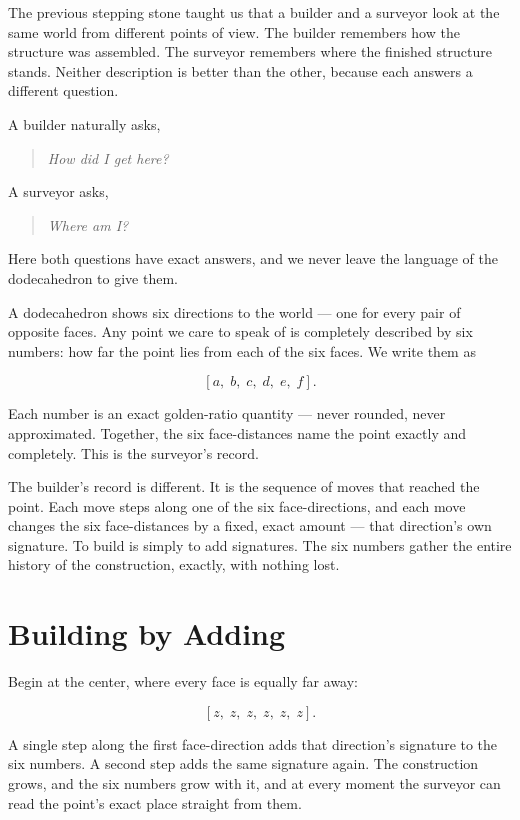 \label{stone:finding-our-way-home}

The previous stepping stone taught us that a builder and a surveyor look at the same world from different points of view. The builder remembers how the structure was assembled. The surveyor remembers where the finished structure stands. Neither description is better than the other, because each answers a different question.

A builder naturally asks,

\begin{quote}
\emph{How did I get here?}
\end{quote}

A surveyor asks,

\begin{quote}
\emph{Where am I?}
\end{quote}

Here both questions have exact answers, and we never leave the language of the dodecahedron to give them.

A dodecahedron shows six directions to the world --- one for every pair of opposite faces. Any point we care to speak of is completely described by six numbers: how far the point lies from each of the six faces. We write them as

\[
[a,\;b,\;c,\;d,\;e,\;f].
\]

Each number is an exact golden-ratio quantity --- never rounded, never approximated. Together, the six face-distances name the point exactly and completely. This is the surveyor's record.

The builder's record is different. It is the sequence of moves that reached the point. Each move steps along one of the six face-directions, and each move changes the six face-distances by a fixed, exact amount --- that direction's own signature. To build is simply to add signatures. The six numbers gather the entire history of the construction, exactly, with nothing lost.

\section*{Building by Adding}

Begin at the center, where every face is equally far away:

\[
[z,\;z,\;z,\;z,\;z,\;z].
\]

A single step along the first face-direction adds that direction's signature to the six numbers. A second step adds the same signature again. The construction grows, and the six numbers grow with it, and at every moment the surveyor can read the point's exact place straight from them.

